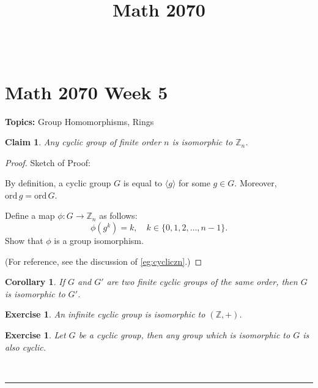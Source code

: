 \documentclass[a4paper,12pt]{report}
\newcommand{\ord}{\mathrm{ord}\,}
\renewcommand{\ord}{\mathrm{ord}\,}
\newcounter{statement}
\numberwithin{statement}{chapter}
\newtheorem{claim}[statement]{Claim}
\newtheorem{cor}[statement]{Corollary}
\newtheorem{ex}[statement]{\bf Exercise}
\numberwithin{equation}{chapter}
\numberwithin{section}{chapter}
\numberwithin{subsection}{section}
\begin{document}
$\newcommand{\ord}{\mathrm{ord}\,}$
\title{Math 2070}
\setcounter{chapter}{5}\setcounter{section}{0}
\setcounter{subsection}{0}


\chapter*{Math 2070 Week 5}
{\bf Topics: }Group Homomorphisms, Rings




\begin{claim}
Any cyclic group of finite order $n$ is isomorphic to $\mathbb{Z}_n$.
\end{claim}
\begin{proof}

Sketch of Proof:



By definition, a cyclic group $G$ is equal to $\langle g\rangle$ for some $g \in G$.
Moreover, $\ord g = \ord G$.



Define a map $\phi : G \longrightarrow \mathbb{Z}_n$ as follows:
\[
\phi(g^k) = k, \quad k \in \{0, 1, 2, \ldots, n - 1\}.
\]
Show that $\phi$ is a group isomorphism.



(For reference, see the discussion of \cref{eg:cycliczn}.)
\end{proof}



\begin{cor}

If $G$ and $G'$ are two finite cyclic groups of the same order, then $G$ is isomorphic to $G'$.

\end{cor}



\begin{ex}

An infinite cyclic group is isomorphic to $(\mathbb{Z}, +)$.
\end{ex}



\begin{ex}

Let $G$ be a cyclic group, then any group which is isomorphic to $G$ is also cyclic.
\end{ex}




\quad\\\hrule
\quad\\
\end{document}
